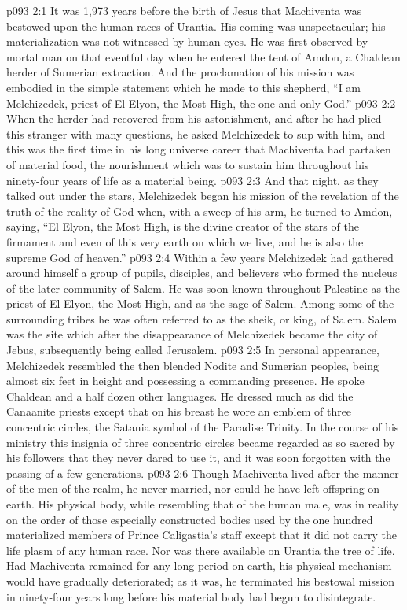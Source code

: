 \vs p093 2:1 It was 1,973 years before the birth of Jesus that Machiventa was bestowed upon the human races of Urantia. His coming was unspectacular; his materialization was not witnessed by human eyes. He was first observed by mortal man on that eventful day when he entered the tent of Amdon, a Chaldean herder of Sumerian extraction. And the proclamation of his mission was embodied in the simple statement which he made to this shepherd, “I am Melchizedek, priest of El Elyon, the Most High, the one and only God.”
\vs p093 2:2 When the herder had recovered from his astonishment, and after he had plied this stranger with many questions, he asked Melchizedek to sup with him, and this was the first time in his long universe career that Machiventa had partaken of material food, the nourishment which was to sustain him throughout his ninety\hyp{}four years of life as a material being.
\vs p093 2:3 And that night, as they talked out under the stars, Melchizedek began his mission of the revelation of the truth of the reality of God when, with a sweep of his arm, he turned to Amdon, saying, “El Elyon, the Most High, is the divine creator of the stars of the firmament and even of this very earth on which we live, and he is also the supreme God of heaven.”
\vs p093 2:4 \pc Within a few years Melchizedek had gathered around himself a group of pupils, disciples, and believers who formed the nucleus of the later community of Salem. He was soon known throughout Palestine as the priest of El Elyon, the Most High, and as the sage of Salem. Among some of the surrounding tribes he was often referred to as the sheik, or king, of Salem. Salem was the site which after the disappearance of Melchizedek became the city of Jebus, subsequently being called Jerusalem.
\vs p093 2:5 \pc In personal appearance, Melchizedek resembled the then blended Nodite and Sumerian peoples, being almost six feet in height and possessing a commanding presence. He spoke Chaldean and a half dozen other languages. He dressed much as did the Canaanite priests except that on his breast he wore an emblem of three concentric circles, the Satania symbol of the Paradise Trinity. In the course of his ministry this insignia of three concentric circles became regarded as so sacred by his followers that they never dared to use it, and it was soon forgotten with the passing of a few generations.
\vs p093 2:6 Though Machiventa lived after the manner of the men of the realm, he never married, nor could he have left offspring on earth. His physical body, while resembling that of the human male, was in reality on the order of those especially constructed bodies used by the one hundred materialized members of Prince Caligastia’s staff except that it did not carry the life plasm of any human race. Nor was there available on Urantia the tree of life. Had Machiventa remained for any long period on earth, his physical mechanism would have gradually deteriorated; as it was, he terminated his bestowal mission in ninety\hyp{}four years long before his material body had begun to disintegrate.

